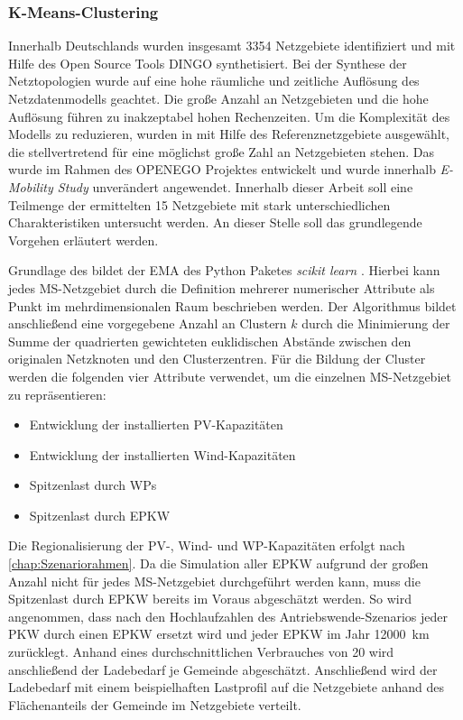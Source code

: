 \subsubsection{K-Means-Clustering}

Innerhalb Deutschlands wurden insgesamt \num{3354} Netzgebiete \cite{Schachler} identifiziert und mit Hilfe des Open Source Tools \gls{DINGO} synthetisiert.
Bei der Synthese der Netztopologien wurde auf eine hohe räumliche und zeitliche Auflösung des Netzdatenmodells geachtet.
Die große Anzahl an Netzgebieten und die hohe Auflösung führen zu inakzeptabel hohen Rechenzeiten.
Um die Komplexität des Modells zu reduzieren, wurden in  mit Hilfe des \kmeans Referenznetzgebiete ausgewählt, die stellvertretend für eine möglichst große Zahl an Netzgebieten stehen.
Das \kmean wurde im Rahmen des \gls{OPENEGO} Projektes \cite{Mueller2019} entwickelt und wurde innerhalb \textit{E-Mobility Study} \cite{Schachler} unverändert angewendet.
Innerhalb dieser Arbeit soll eine Teilmenge der ermittelten \num{15} Netzgebiete mit stark unterschiedlichen Charakteristiken untersucht werden.
An dieser Stelle soll das grundlegende Vorgehen erläutert werden. \medskip

Grundlage des \kmeans bildet der \gls{EMA} des Python Paketes \textit{scikit learn} \cite{scikit-learn2011}.
Hierbei kann jedes \gls{MS}-Netzgebiet durch die Definition mehrerer numerischer Attribute als Punkt im mehrdimensionalen Raum beschrieben werden.
Der Algorithmus bildet anschließend eine vorgegebene Anzahl an Clustern $k$ durch die Minimierung der Summe der quadrierten gewichteten euklidischen Abstände zwischen den originalen Netzknoten und den Clusterzentren.
Für die Bildung der Cluster werden die folgenden vier Attribute verwendet, um die einzelnen \gls{MS}-Netzgebiet zu repräsentieren:

\begin{itemize}
	\item Entwicklung der installierten \gls{PV}-Kapazitäten
	\item Entwicklung der installierten Wind-Kapazitäten
	\item Spitzenlast durch \glspl{WP}
	\item Spitzenlast durch \gls{EPKW}
\end{itemize}

Die Regionalisierung der \gls{PV}-, Wind- und \gls{WP}-Kapazitäten erfolgt nach \autoref{chap:Szenariorahmen}.
Da die Simulation aller \gls{EPKW} aufgrund der großen Anzahl nicht für jedes \gls{MS}-Netzgebiet durchgeführt werden kann, muss die Spitzenlast durch \gls{EPKW} bereits im Voraus abgeschätzt werden.
So wird angenommen, dass nach den Hochlaufzahlen des Antriebswende-Szenarios jeder \gls{PKW} durch einen \gls{EPKW} ersetzt wird und jeder \gls{EPKW} im Jahr \SI{12000}{\km} zurücklegt.
Anhand eines durchschnittlichen Verbrauches von \SI{20}{\kwhkm} wird anschließend der Ladebedarf je Gemeinde abgeschätzt.
Anschließend wird der Ladebedarf mit einem beispielhaften Lastprofil auf die Netzgebiete anhand des Flächenanteils der Gemeinde im Netzgebiete verteilt.


